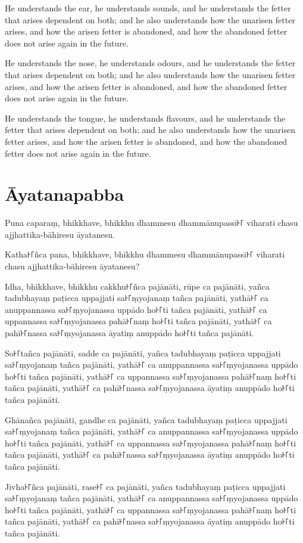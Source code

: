 He understands the ear, he understands sounds, and he understands the fetter
that arises dependent on both; and he also understands how the unarisen fetter
arises, and how the arisen fetter is abandoned, and how the abandoned fetter
does not arise again in the future.

He understands the nose, he understands odours, and he understands the fetter
that arises dependent on both; and he also understands how the unarisen fetter
arises, and how the arisen fetter is abandoned, and how the abandoned fetter
does not arise again in the future.

He understands the tongue, he understands flavours, and he understands the
fetter that arises dependent on both; and he also understands how the unarisen
fetter arises, and how the arisen fetter is abandoned, and how the abandoned
fetter does not arise again in the future.

\paliPage
\section*{Āyatanapabba}

Puna caparaṃ, bhikkhave, bhikkhu dhammesu dhammānupassī꜔꜒ viharati chasu
ajjhattika-bāhiresu āyatanesu.

Katha꜔꜒ñca pana, bhikkhave, bhikkhu dhammesu dhammānupassī꜔꜒ viharati chasu
ajjhattika-bāhiresu āyatanesu?

Idha, bhikkhave, bhikkhu
cakkhu꜔꜒ñca pajānāti,
rūpe ca pajānāti,
yañca tadubhayaṃ paṭicca uppajjati sa꜔꜒ṃyojanaṃ tañca pajānāti,
yathā꜔꜒ ca anuppannassa sa꜔꜒ṃyojanassa uppādo ho꜔꜒ti tañca pajānāti,
yathā꜔꜒ ca uppannassa sa꜔꜒ṃyojanassa pahā꜔꜒naṃ ho꜔꜒ti tañca pajānāti,
yathā꜔꜒ ca pahī꜔꜒nassa sa꜔꜒ṃyojanassa āyatiṃ anuppādo ho꜔꜒ti tañca pajānāti.

So꜔꜒tañca pajānāti,
sadde ca pajānāti,
yañca tadubhayaṃ paṭicca uppajjati sa꜔꜒ṃyojanaṃ tañca pajānāti,
yathā꜔꜒ ca anuppannassa sa꜔꜒ṃyojanassa uppādo ho꜔꜒ti tañca pajānāti,
yathā꜔꜒ ca uppannassa sa꜔꜒ṃyojanassa pahā꜔꜒naṃ ho꜔꜒ti tañca pajānāti,
yathā꜔꜒ ca pahī꜔꜒nassa sa꜔꜒ṃyojanassa āyatiṃ anuppādo ho꜔꜒ti tañca pajānāti.

Ghānañca pajānāti,
gandhe ca pajānāti,
yañca tadubhayaṃ paṭicca uppajjati sa꜔꜒ṃyojanaṃ tañca pajānāti,
yathā꜔꜒ ca anuppannassa sa꜔꜒ṃyojanassa uppādo ho꜔꜒ti tañca pajānāti,
yathā꜔꜒ ca uppannassa sa꜔꜒ṃyojanassa pahā꜔꜒naṃ ho꜔꜒ti tañca pajānāti,
yathā꜔꜒ ca pahī꜔꜒nassa sa꜔꜒ṃyojanassa āyatiṃ anuppādo ho꜔꜒ti tañca pajānāti.

Jivha꜔꜒ñca pajānāti,
rase꜔꜒ ca pajānāti,
yañca tadubhayaṃ paṭicca uppajjati sa꜔꜒ṃyojanaṃ tañca pajānāti,
yathā꜔꜒ ca anuppannassa sa꜔꜒ṃyojanassa uppādo ho꜔꜒ti tañca pajānāti,
yathā꜔꜒ ca uppannassa sa꜔꜒ṃyojanassa pahā꜔꜒naṃ ho꜔꜒ti tañca pajānāti,
yathā꜔꜒ ca pahī꜔꜒nassa sa꜔꜒ṃyojanassa āyatiṃ anuppādo ho꜔꜒ti tañca pajānāti.

